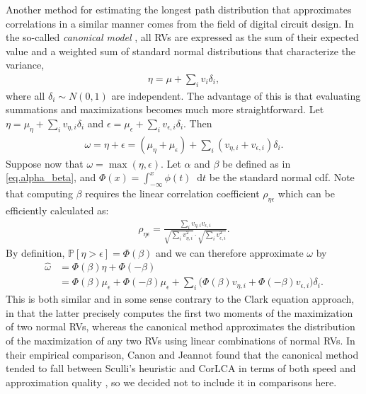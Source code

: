 \documentclass[12pt]{article}
\def\P{\mathbb{P}}
\def\diff{\mathop{}\!\mathrm{d}}
\begin{document}
Another method for estimating the longest path distribution that approximates correlations in a similar manner comes from the field of digital circuit design. In the so-called {\em canonical model} \cite{vis06,zha06}, all RVs are expressed as the sum of their expected value and a weighted sum of standard normal distributions that characterize the variance, 
\begin{align*}
\eta = \mu + \sum_i v_i \delta_i,
\end{align*}  
where all $\delta_i \sim N(0, 1)$ are independent. The advantage of this is that evaluating summations and maximizations becomes much more straightforward. Let $\eta = \mu_\eta + \sum_i v_{\eta, i} \delta_i$ and $\epsilon = \mu_\epsilon + \sum_i v_{\epsilon, i} \delta_i$. Then 
\begin{align*}
\omega = \eta + \epsilon = (\mu_\eta + \mu_\epsilon) + \sum_i (v_{\eta, i} + v_{\epsilon, i}) \delta_i.
\end{align*}
Suppose now that $\omega = \max(\eta, \epsilon)$. Let $\alpha$ and $\beta$ be defined as in \eqref{eq.alpha_beta}, and $\Phi(x) = \int_{-\infty}^{x} \phi(t) \diff t$ be the standard normal cdf. Note that computing $\beta$ requires the linear correlation coefficient $\rho_{\eta\epsilon}$ which can be efficiently calculated as:
\begin{align*}
\rho_{\eta\epsilon} = \frac{\sum_i v_{\eta, i} v_{\epsilon, i}}{\sqrt{\sum_i v_{\eta, i}^2} \cdot \sqrt{\sum_i v_{\epsilon, i}^2} }.
\end{align*}
By definition, $\P[\eta > \epsilon] = \Phi(\beta)$ and we can therefore approximate $\omega$ by 
\begin{align*}
\hat{\omega} &= \Phi(\beta)\eta + \Phi(-\beta) \\
&= \Phi(\beta) \mu_\epsilon + \Phi(-\beta) \mu_\epsilon + \sum_i \big( \Phi(\beta) v_{\eta, i} + \Phi(-\beta) v_{\epsilon, i} \big) \delta_i.
\end{align*}
This is both similar and in some sense contrary to the Clark equation approach, in that the latter precisely computes the first two moments of the maximization of two normal RVs, whereas the canonical method approximates the distribution of the maximization of any two RVs using linear combinations of normal RVs. In their empirical comparison, Canon and Jeannot found that the canonical method tended to fall between Sculli's heuristic and CorLCA in terms of both speed and approximation quality \cite{can16}, so we decided not to include it in comparisons here. 
\end{document}

